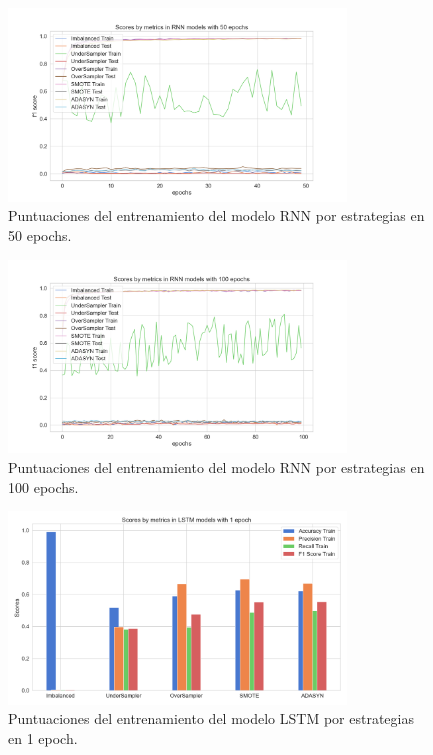 \begin{figure}[h!]
	\centering
	\includegraphics[width=0.8\textwidth]{"figuras/Experimento5/RNN/RNN_50_train"}
	\caption{Puntuaciones del entrenamiento del modelo RNN por estrategias en 50 epochs.}
	\label{an:41}
\end{figure}

\begin{figure}[h!]
	\centering
	\includegraphics[width=0.8\textwidth]{"figuras/Experimento5/RNN/RNN_100_train"}
	\caption{Puntuaciones del entrenamiento del modelo RNN por estrategias en 100 epochs.}
	\label{an:42}
\end{figure}

\begin{figure}[h!]
	\centering
	\includegraphics[width=0.8\textwidth]{"figuras/Experimento5/LSTM/LSTM_1_train"}
	\caption{Puntuaciones del entrenamiento del modelo LSTM por estrategias en 1 epoch.}
	\label{an:43}
\end{figure}

